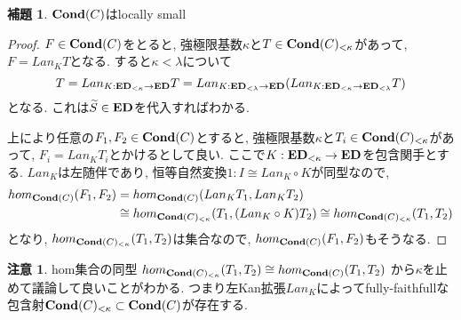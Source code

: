 \documentclass[dvipdfmx,a4paper,11pt]{article}
\theoremstyle{definition}
\newtheorem{lem}[thm]{補題}
\newtheorem{rem}[thm]{注意}
\begin{document}
\begin{tcolorbox}
 [colback = white, colframe = green!35!black, fonttitle = \bfseries,breakable = true]
\begin{lem}
${\bf Cond}(C)$はlocally small
\end{lem}
 \end{tcolorbox}
\begin{proof}
$F \in {\bf Cond}(C)$をとると, 強極限基数$\kappa$と$T \in {\bf Cond}(C)_{< \kappa}$があって, $F = Lan_{K}T$となる. 
すると$\kappa < \lambda$について
$$T = Lan_{K: {\bf ED}_{< \kappa} \to {\bf ED}}T 
= Lan_{K: {\bf ED}_{< \lambda } \to {\bf ED}} (Lan_{K: {\bf ED}_{< \kappa} \to {\bf ED}_{< \lambda}}T)$$
となる. これは$\widetilde{S} \in {\bf ED}$を代入すればわかる. 

上により任意の$F_1, F_2 \in {\bf Cond}(C)$とすると, 強極限基数$\kappa$と$T_i \in {\bf Cond}(C)_{< \kappa}$があって, $F_i = Lan_{K}T_i$とかけるとして良い. 
ここで$K : {\bf ED}_{< \kappa} \to {\bf ED}$を包含関手とする.
$ Lan_{K}$は左随伴であり, 恒等自然変換$1: I \cong  Lan_{K} \circ K$が同型なので, 
\begin{align*}
\begin{split}
hom_{{\bf Cond}(C)}(F_1, F_2)
&=
hom_{{\bf Cond}(C)}( Lan_{K}T_1,  Lan_{K}T_2)\\
&\cong
hom_{{\bf Cond}(C)_{<\kappa}}(T_1,  (Lan_{K} \circ K)T_2)
\cong 
hom_{{\bf Cond}(C)_{<\kappa}}(T_1, T_2)
\end{split}
\end{align*}
となり, $hom_{{\bf Cond}(C)_{<\kappa}}(T_1, T_2)$は集合なので, $hom_{{\bf Cond}(C)}(F_1, F_2)$もそうなる. 
\end{proof}

\begin{rem}
hom集合の同型
$hom_{{\bf Cond}(C)_{<\kappa}}(T_1,  T_2)
\cong 
hom_{{\bf Cond}(C)}(T_1, T_2)$
から$\kappa$を止めて議論して良いことがわかる.
つまり左Kan拡張$Lan_{K}$によってfully-faithfullな包含射${\bf Cond}(C)_{< \kappa} \subset {\bf Cond}(C)$が存在する. 
\end{rem}
\end{document}
